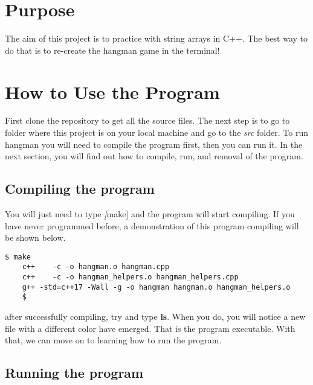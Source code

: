 \documentclass{article}
\title{\ASSIGNMENT}
\author{\NAME}
\date{\CLASS}
\begin{document}
\pagestyle{fancy}
\fancyfoot{}
\fancyhead{}
\fancyfoot[L]{\ASSIGNMENT\ -- \CLASS\ -- \NAME}
\fancyfoot[R]{\thepage}

\maketitle


\section{Purpose}

The aim of this project is to practice with string arrays in C++. The best way to do that is to re-create the hangman game in the terminal! 

\section{How to Use the Program}

First clone the repository to get all the source files. The next step is to go to folder where this project is on your local machine and go to the \textit{src} folder. To run hangman you will need to compile the program first, then you can run it. In the next section, you will find out how to compile, run, and removal of the program.

\subsection{Compiling the program}

You will just need to type \textit[make] and the program will start compiling. If you have never programmed before, a demonstration of this program compiling will be shown below.

\begin{Verbatim}[frame=single]
    $ make
    c++    -c -o hangman.o hangman.cpp
    c++    -c -o hangman_helpers.o hangman_helpers.cpp
    g++ -std=c++17 -Wall -g -o hangman hangman.o hangman_helpers.o
    $
\end{Verbatim}

after successfully compiling, try and type \textbf{ls}. When you do, you will notice a new file with a different color have emerged. That is the program executable. With that, we can move on to learning how to run the program.

\subsection{Running the program}
\end{document}
